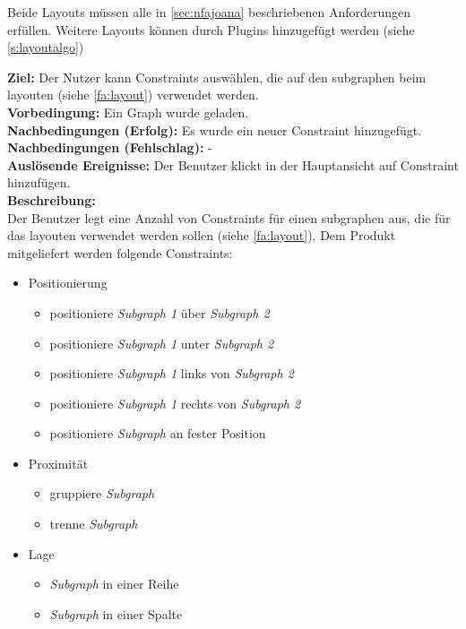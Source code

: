 Beide Layouts müssen alle in \ref{sec:nfajoana} beschriebenen Anforderungen erfüllen.
Weitere Layouts können durch Plugins hinzugefügt werden (siehe \ref{s:layoutalgo})

\label{fa:constraints}
\textbf{Ziel:} Der Nutzer kann Constraints auswählen, die auf den \gls{subgraph}en beim layouten (siehe \ref{fa:layout}) verwendet werden.\\
\textbf{Vorbedingung:} Ein Graph wurde geladen.\\
\textbf{Nachbedingungen (Erfolg):} Es wurde ein neuer Constraint hinzugefügt.\\
\textbf{Nachbedingungen (Fehlschlag):} -\\
\textbf{Auslösende Ereignisse:} Der Benutzer klickt in der Hauptansicht auf Constraint hinzufügen.\\
\textbf{Beschreibung: } \\
Der Benutzer legt eine Anzahl von Constraints für einen \gls{subgraph}en aus, die für das layouten verwendet werden sollen (siehe \ref{fa:layout}).
Dem Produkt mitgeliefert werden folgende Constraints: %
\begin{itemize}[nolistsep]
  \item Positionierung
  \begin{itemize}[nolistsep]
    \item positioniere \textit{Subgraph 1} über \textit{Subgraph 2}
    \item positioniere \textit{Subgraph 1} unter \textit{Subgraph 2}
    \item positioniere \textit{Subgraph 1} links von \textit{Subgraph 2}
    \item positioniere \textit{Subgraph 1} rechts von \textit{Subgraph 2}
    \item positioniere \textit{Subgraph} an fester Position
  \end{itemize}
  \item Proximität
  \begin{itemize}[nolistsep]
    \item gruppiere \textit{Subgraph}
    \item trenne \textit{Subgraph}
  \end{itemize}
  \item Lage
  \begin{itemize}[nolistsep]
    \item \textit{Subgraph} in einer Reihe
    \item \textit{Subgraph} in einer Spalte
  \end{itemize}
\end{itemize}

